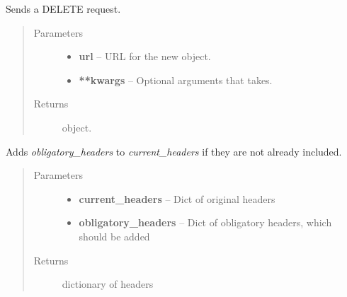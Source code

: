 \documentclass[letterpaper,10pt,english]{sphinxmanual}
\begin{document}

\begin{fulllineitems}
\label{web_portal:core.courses.utils.send_delete_request}
Sends a DELETE request.
\begin{quote}\begin{description}
\item[{Parameters}] \leavevmode\begin{itemize}
\item {} 
\textbf{url} -- URL for the new  object.

\item {} 
\textbf{**kwargs} -- Optional arguments that  takes.

\end{itemize}

\item[{Returns}] \leavevmode
{} object.

\end{description}\end{quote}

\end{fulllineitems}


\begin{fulllineitems}
\label{web_portal:core.courses.utils.prepare_headers}
Adds \emph{obligatory\_headers} to \emph{current\_headers} if they are not already
included.
\begin{quote}\begin{description}
\item[{Parameters}] \leavevmode\begin{itemize}
\item {} 
\textbf{current\_headers} -- Dict of original headers

\item {} 
\textbf{obligatory\_headers} -- Dict of obligatory headers, which should be added

\end{itemize}

\item[{Returns}] \leavevmode
dictionary of headers

\end{description}\end{quote}

\end{fulllineitems}
\end{document}
